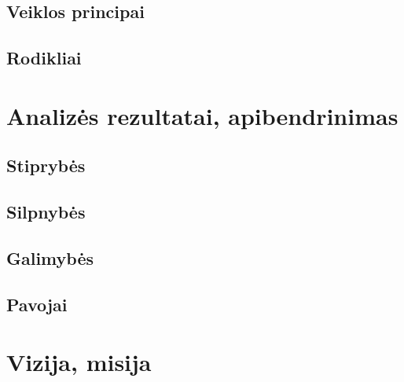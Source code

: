 \documentclass[oneside]{VUMIFPSkursinis}
\begin{document}
	\subsection{Veiklos principai}
	\subsection{Rodikliai}
\section{Analizės rezultatai, apibendrinimas}
	\subsection{Stiprybės}
	\subsection{Silpnybės}
	\subsection{Galimybės}
	\subsection{Pavojai}
\section{Vizija, misija}
\end{document}
